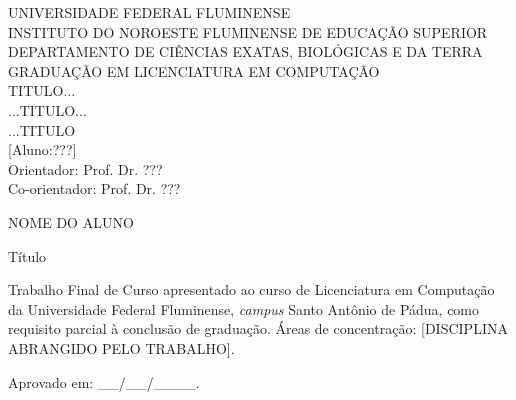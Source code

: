 \begin{center}

  {\large UNIVERSIDADE FEDERAL FLUMINENSE}
  \\[0.2cm]
  {\large INSTITUTO DO NOROESTE FLUMINENSE DE EDUCAÇÃO SUPERIOR}
  \\[0.2cm]
  {\large DEPARTAMENTO DE CIÊNCIAS EXATAS, BIOLÓGICAS E DA TERRA}
  \\[0.2cm]
  {\large GRADUAÇÃO EM LICENCIATURA EM COMPUTAÇÃO}
  \\[7cm]
  { \huge TITULO... }
  \\[0.25cm]
 {\huge  ...TITULO... }
  \\[0.25cm]
  {\huge ...TITULO} 
  \\[9cm]



{\large [Aluno:???] }
\\[0.2cm]
{\large Orientador: Prof. Dr. ???}
\\[0.2cm]
{\large Co-orientador: Prof. Dr. ???}
\\[0.2cm]
\end{center}

\newpage

\blankpage

\imprimirfolhaderosto*

\blankpage

\vspace{1.5cm}

\begin{center}
\large{NOME DO ALUNO}

\vspace{1.5cm}

{\Large{Título}}

\end{center}

\vspace{1cm}

\begin{flushright}
\begin{minipage}{15.6cm} 
Trabalho Final de Curso apresentado ao curso de Licenciatura em Computação da Universidade Federal Fluminense, \textit{campus} Santo Antônio de Pádua, como requisito parcial à conclusão de graduação.
Áreas de concentração: [DISCIPLINA ABRANGIDO PELO TRABALHO].
\end{minipage}
\end{flushright}


\begin{flushleft}
\begin{minipage}{15.6cm}
\hspace{0.3cm} Aprovado em: \_\_/\_\_/\_\_\_\_.
\end{minipage}
\end{flushleft}
 
